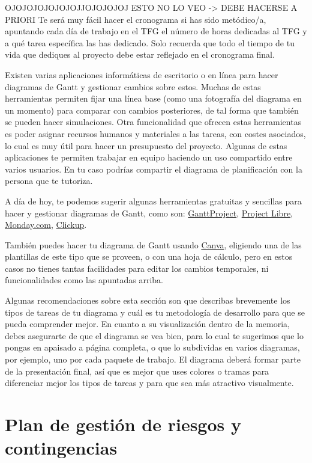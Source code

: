 OJOJOJOJOJOJOJJOJOJOJOJ ESTO NO LO VEO -> DEBE HACERSE A PRIORI
Te será muy fácil hacer el cronograma si has sido metódico/a, apuntando cada día de trabajo en el TFG el número de horas dedicadas al TFG y a qué tarea específica las has dedicado. Solo recuerda que todo el tiempo de tu vida que dediques al proyecto debe estar reflejado en el cronograma final. 

Existen varias aplicaciones informáticas de escritorio o en línea para hacer diagramas de Gantt y gestionar cambios sobre estos. Muchas de estas herramientas permiten fijar una línea base (como una fotografía del diagrama en un momento) para comparar con cambios posteriores, de tal forma que también se pueden hacer simulaciones. Otra funcionalidad que ofrecen estas herramientas es poder asignar recursos humanos y materiales a las tareas, con costes asociados, lo cual es muy útil para hacer un presupuesto del proyecto. Algunas de estas aplicaciones te permiten trabajar en equipo haciendo un uso compartido entre varios usuarios. En tu caso podrías compartir el diagrama de planificación con la persona que te tutoriza.

A día de hoy, te podemos sugerir algunas herramientas gratuitas y sencillas para hacer y gestionar diagramas de Gantt, como son: \href{https://www.ganttproject.biz/}{GanttProject}, \href{https://www.projectlibre.com/}{Project Libre}, 
 \href{https://www.monday.com}{Monday.com}, \href{https://app.clickup.com/}{Clickup}. 

También puedes hacer tu diagrama de Gantt usando \href{https://www.canva.com/}{Canva}, eligiendo una de las plantillas de este tipo que se proveen, o con una hoja de cálculo, pero en estos casos no tienes tantas facilidades para editar los cambios temporales, ni funcionalidades como las apuntadas arriba.

Algunas recomendaciones sobre esta sección son que describas brevemente los tipos de tareas de tu diagrama y cuál es tu metodología de desarrollo para que se pueda comprender mejor. En cuanto a su visualización dentro de la memoria, debes asegurarte de que el diagrama se vea bien, para lo cual te sugerimos que lo pongas en apaisado a página completa, o que lo subdividas en varios diagramas, por ejemplo, uno por cada paquete de trabajo. El diagrama deberá formar parte de la presentación final, así que es mejor que uses colores o tramas para diferenciar mejor los tipos de tareas y para que sea más atractivo visualmente. 

\section{Plan de gestión de riesgos y contingencias}

